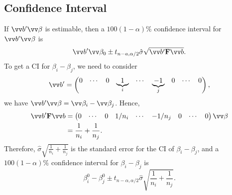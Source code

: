 \subsection*{Confidence Interval}
If $ \Vector{b}'\Vector{\beta} $ is estimable, then a $ 100(1-\alpha)\% $
confidence interval for $ \Vector{b}'\Vector{\beta} $ is
\[ \Vector{b}'\Vector{\beta}_0\pm t_{n-a,\alpha/2}\hat{\sigma}\sqrt{\Vector{b}'\Matrix{F}\Vector{b}}. \]
To get a CI for $ \beta_i-\beta_j $, we need to consider
\[ \Vector{b}'=\begin{pmatrix}
        0 & \cdots & 0 & \underbrace{1}_i & \cdots & \underbrace{-1}_{j} & 0 & \cdots & 0
    \end{pmatrix}, \]
we have $ \Vector{b}'\Vector{\beta}=\Vector{\beta}_i-\Vector{\beta}_j $. Hence,
\begin{align*}
    \Vector{b}'\Matrix{F}\Vector{b}
     & =\begin{pmatrix}
            0 & \cdots & 0 & 1/n_i & \cdots & -1/n_j & 0 & \cdots & 0
        \end{pmatrix}\Vector{\beta} \\
     & =\frac{1}{n_i}+\frac{1}{n_j}.
\end{align*}
Therefore, $ \hat{\sigma}\sqrt{\frac{1}{n_i}+\frac{1}{n_j}} $ is the standard
error for the CI of $ \beta_i-\beta_j $, and a $ 100(1-\alpha)\% $ confidence
interval for $ \beta_i-\beta_j $ is
\[ \beta_i^0-\beta_j^0\pm t_{n-\alpha,\alpha/2}\hat{\sigma}\sqrt{\frac{1}{n_i}+\frac{1}{n_j}}. \]
